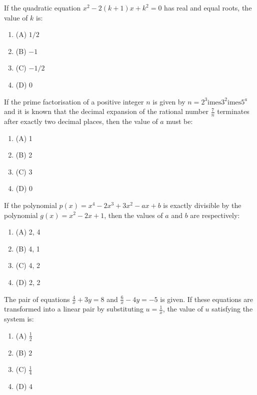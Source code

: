 \documentclass[12pt,a4paper]{exam}
\begin{document}
\begin{questions}
\question[1] If the quadratic equation $x^2 - 2(k+1)x + k^2 = 0$ has real and equal roots, the value of $k$ is:
\begin{enumerate}[label=(\Alph*)]
  \item (A) $1/2$
  \item (B) $-1$
  \item (C) $-1/2$
  \item (D) $0$
\end{enumerate}
\vspace{0.15cm}

\question[1] If the prime factorisation of a positive integer $n$ is given by $n = 2^3 \text{imes} 3^2 \text{imes} 5^a$ and it is known that the decimal expansion of the rational number $\frac{7}{n}$ terminates after exactly two decimal places, then the value of $a$ must be:
\begin{enumerate}[label=(\Alph*)]
  \item (A) 1
  \item (B) 2
  \item (C) 3
  \item (D) 0
\end{enumerate}
\vspace{0.15cm}

\question[1] If the polynomial $p(x) = x^4 - 2x^3 + 3x^2 - ax + b$ is exactly divisible by the polynomial $g(x) = x^2 - 2x + 1$, then the values of $a$ and $b$ are respectively:
\begin{enumerate}[label=(\Alph*)]
  \item (A) 2, 4
  \item (B) 4, 1
  \item (C) 4, 2
  \item (D) 2, 2
\end{enumerate}
\vspace{0.15cm}

\question[1] The pair of equations $\frac{4}{x} + 3y = 8$ and $\frac{6}{x} - 4y = -5$ is given. If these equations are transformed into a linear pair by substituting $u = \frac{1}{x}$, the value of $u$ satisfying the system is:
\begin{enumerate}[label=(\Alph*)]
  \item (A) $\frac{1}{2}$
  \item (B) $2$
  \item (C) $\frac{1}{4}$
  \item (D) $4$
\end{enumerate}
\vspace{0.15cm}


\end{questions}
\end{document}
